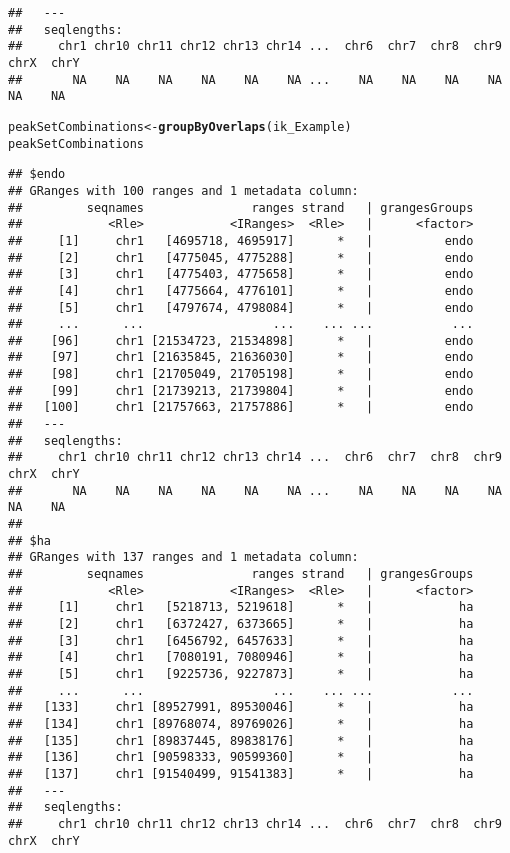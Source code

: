 \documentclass[12pt]{article}\usepackage[]{graphicx}\usepackage[usenames,dvipsnames]{color}
\makeatletter
\newcommand{\hlstd}[1]{\textcolor[rgb]{0.345,0.345,0.345}{#1}}%
\newcommand{\hlkwb}[1]{\textcolor[rgb]{0.69,0.353,0.396}{#1}}%
\newcommand{\hlkwd}[1]{\textcolor[rgb]{0.737,0.353,0.396}{\textbf{#1}}}%
\newenvironment{kframe}{%
 \def\at@end@of@kframe{}%
 \ifinner\ifhmode%
  \def\at@end@of@kframe{\end{minipage}}%
  \begin{minipage}{\columnwidth}%
 \fi\fi%
 \def\FrameCommand##1{\hskip\@totalleftmargin \hskip-\fboxsep
 \colorbox{shadecolor}{##1}\hskip-\fboxsep
     \hskip-\linewidth \hskip-\@totalleftmargin \hskip\columnwidth}%
 \MakeFramed {\advance\hsize-\width
   \@totalleftmargin\z@ \linewidth\hsize
   \@setminipage}}%
 {\par\unskip\endMakeFramed%
 \at@end@of@kframe}
\newenvironment{knitrout}{}{} %
\makeatother
\begin{document}
\begin{knitrout}
\begin{kframe}
\begin{verbatim}
##   ---
##   seqlengths:
##     chr1 chr10 chr11 chr12 chr13 chr14 ...  chr6  chr7  chr8  chr9  chrX  chrY
##       NA    NA    NA    NA    NA    NA ...    NA    NA    NA    NA    NA    NA
\end{verbatim}
\begin{alltt}
\hlstd{peakSetCombinations} \hlkwb{<-} \hlkwd{groupByOverlaps}\hlstd{(ik_Example)}
\hlstd{peakSetCombinations}
\end{alltt}
\begin{verbatim}
## $endo
## GRanges with 100 ranges and 1 metadata column:
##         seqnames               ranges strand   | grangesGroups
##            <Rle>            <IRanges>  <Rle>   |      <factor>
##     [1]     chr1   [4695718, 4695917]      *   |          endo
##     [2]     chr1   [4775045, 4775288]      *   |          endo
##     [3]     chr1   [4775403, 4775658]      *   |          endo
##     [4]     chr1   [4775664, 4776101]      *   |          endo
##     [5]     chr1   [4797674, 4798084]      *   |          endo
##     ...      ...                  ...    ... ...           ...
##    [96]     chr1 [21534723, 21534898]      *   |          endo
##    [97]     chr1 [21635845, 21636030]      *   |          endo
##    [98]     chr1 [21705049, 21705198]      *   |          endo
##    [99]     chr1 [21739213, 21739804]      *   |          endo
##   [100]     chr1 [21757663, 21757886]      *   |          endo
##   ---
##   seqlengths:
##     chr1 chr10 chr11 chr12 chr13 chr14 ...  chr6  chr7  chr8  chr9  chrX  chrY
##       NA    NA    NA    NA    NA    NA ...    NA    NA    NA    NA    NA    NA
## 
## $ha
## GRanges with 137 ranges and 1 metadata column:
##         seqnames               ranges strand   | grangesGroups
##            <Rle>            <IRanges>  <Rle>   |      <factor>
##     [1]     chr1   [5218713, 5219618]      *   |            ha
##     [2]     chr1   [6372427, 6373665]      *   |            ha
##     [3]     chr1   [6456792, 6457633]      *   |            ha
##     [4]     chr1   [7080191, 7080946]      *   |            ha
##     [5]     chr1   [9225736, 9227873]      *   |            ha
##     ...      ...                  ...    ... ...           ...
##   [133]     chr1 [89527991, 89530046]      *   |            ha
##   [134]     chr1 [89768074, 89769026]      *   |            ha
##   [135]     chr1 [89837445, 89838176]      *   |            ha
##   [136]     chr1 [90598333, 90599360]      *   |            ha
##   [137]     chr1 [91540499, 91541383]      *   |            ha
##   ---
##   seqlengths:
##     chr1 chr10 chr11 chr12 chr13 chr14 ...  chr6  chr7  chr8  chr9  chrX  chrY

\end{verbatim}
\end{kframe}
\end{knitrout}
\end{document}
